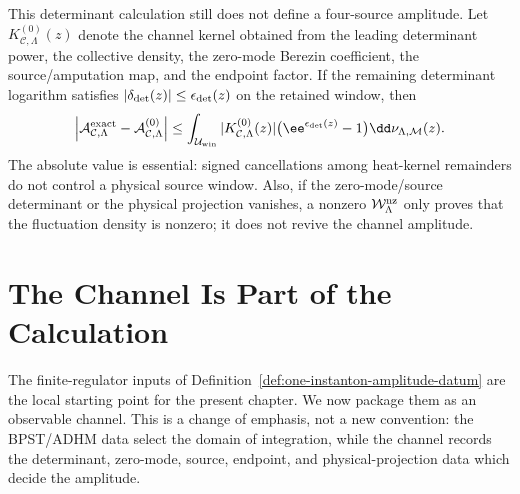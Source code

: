 \begin{controlledapproximation}
This determinant calculation still does not define a four-source amplitude.
Let \(K_{\mathcal C,\Lambda}^{(0)}(z)\) denote the channel kernel obtained
from the leading determinant power, the collective density, the zero-mode
Berezin coefficient, the source/amputation map, and the endpoint factor.  If
the remaining determinant logarithm satisfies
\(|\delta_{\rm det}(z)|\le\epsilon_{\rm det}(z)\) on the retained window, then
\begin{equation}
  \left|
  \mathcal A_{\mathcal C,\Lambda}^{\rm exact}
  -
  \mathcal A_{\mathcal C,\Lambda}^{(0)}
  \right|
  \le
  \int_{\mathcal U_{\rm win}}
  |K_{\mathcal C,\Lambda}^{(0)}(z)|
  \bigl(\ee^{\epsilon_{\rm det}(z)}-1\bigr)
  \dd\nu_{\Lambda,\mathcal M}(z).
  \label{eq:instanton-proper-time-channel-window-bound}
\end{equation}
The absolute value is essential: signed cancellations among heat-kernel
remainders do not control a physical source window.  Also, if the
zero-mode/source determinant or the physical projection vanishes, a nonzero
\(\mathcal W^{\rm nz}_{\Lambda}\) only proves that the fluctuation density is
nonzero; it does not revive the channel amplitude.
\end{controlledapproximation}

\section{The Channel Is Part of the Calculation}
\label{sec:instanton-physical-amplitude-channel}

The finite-regulator inputs
of Definition~\ref{def:one-instanton-amplitude-datum} are the local starting
point for the present chapter.  We now package them as an observable channel.
This is a change of emphasis, not a new convention: the BPST/ADHM data select
the domain of integration, while the channel records the determinant,
zero-mode, source, endpoint, and physical-projection data which decide the
amplitude.

